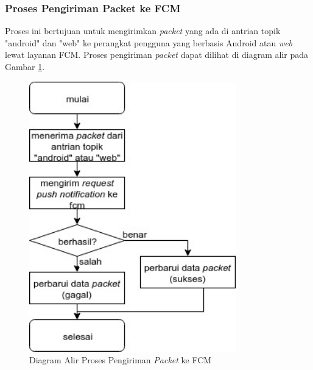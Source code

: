 \subsubsection{Proses Pengiriman Packet ke FCM}
\par Proses ini bertujuan untuk mengirimkan \textit{packet} yang ada di antrian topik "android" dan "web" ke perangkat pengguna yang berbasis Android atau \textit{web} lewat layanan FCM. Proses pengiriman \textit{packet} dapat dilihat di diagram alir pada Gambar \ref{flowchart_pengiriman_packet_ke_fcm}.
\begin{figure}[H]
	\centering\includegraphics[width=0.8\textwidth]{bab3/img/flowchart-pengiriman_packet_ke_fcm.jpg}
	\caption{Diagram Alir Proses Pengiriman \textit{Packet} ke FCM} \label{flowchart_pengiriman_packet_ke_fcm}
\end{figure}

\clearpage
